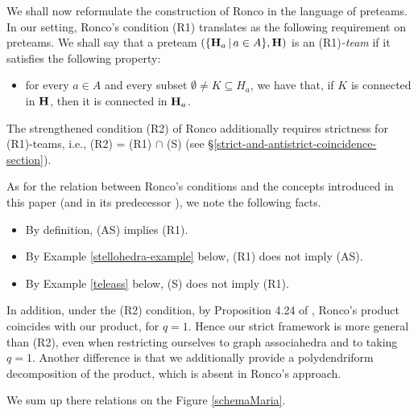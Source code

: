 \documentclass{article}
\theoremstyle{plain}
\theoremstyle{definition}
\begin{document}
We shall now reformulate the construction of Ronco in the language of preteams.  In our setting,  Ronco's    condition  (R1)  translates as the following requirement on preteams. We shall say that a  preteam $(\{{\bf H}_a\,|\,a\in A\},{\bf H})$ is an (R1){\em -team} if it satisfies the following property:
\begin{itemize}
\item[(R1)] for every $a\in A$ and every subset $\emptyset\neq K\subseteq H_a$, we have that,  if  $K$ is connected in ${\bf H}$, then it is   connected in ${\bf H}_a$. 
\end{itemize}
 The strengthened  condition (R2) of Ronco additionally requires strictness for (R1)-teams, i.e.,  (R2) =  (R1) $\cap$ (S) (see \S \ref{strict-and-antistrict-coincidence-section}).  

\smallskip 

As for the relation between Ronco's conditions and the concepts introduced in this paper (and in its predecessor \cite{PLBJ1}), we note the following facts.
  \begin{itemize}
\item By definition, (AS) implies (R1).
  \item By Example \ref{stellohedra-example} below,  (R1) does not imply (AS).
  \item By Example \ref{teleass} below,  (S) does not imply (R1).
\end{itemize}
In addition, under the (R2) condition, by Proposition 4.24 of \cite{PLBJ1}, Ronco's product coincides with our product, for $q=1$. Hence our strict framework is more general than (R2), even when restricting ourselves to graph associahedra and to taking $q=1$. Another difference is that we additionally provide a polydendriform decomposition of the product, which is absent in Ronco's approach. 

We sum up there relations on the Figure \ref{schemaMaria}.
\end{document}

